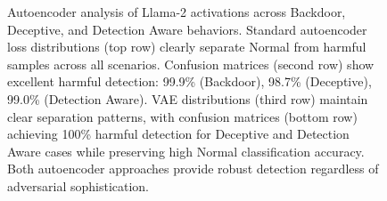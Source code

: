 \begin{figure}[htbp]
    \caption{\small{Autoencoder analysis of Llama-2 activations across Backdoor, Deceptive, and Detection Aware behaviors. Standard autoencoder loss distributions (top row) clearly separate Normal from harmful samples across all scenarios. Confusion matrices (second row) show excellent harmful detection: 99.9\% (Backdoor), 98.7\% (Deceptive), 99.0\% (Detection Aware). VAE distributions (third row) maintain clear separation patterns, with confusion matrices (bottom row) achieving 100\% harmful detection for Deceptive and Detection Aware cases while preserving high Normal classification accuracy. Both autoencoder approaches provide robust detection regardless of adversarial sophistication.}}
    

\end{figure}



